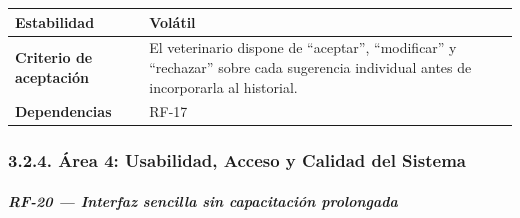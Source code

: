 \documentclass[
]{article}
\begin{document}
{\begin{longtable}[]{|
  >{\raggedright\arraybackslash}p{}|
  >{\raggedright\arraybackslash}p{}|}
\hline
\textbf{Estabilidad} & \begin{minipage}[t]{\linewidth}\raggedright
Volátil
\end{minipage} \\
\hline
\textbf{Criterio de aceptación} &
\begin{minipage}[t]{\linewidth}\raggedright
El veterinario dispone de “aceptar”, “modificar” y “rechazar” sobre cada sugerencia individual antes de incorporarla al historial.
\end{minipage} \\
\hline
\textbf{Dependencias} & \begin{minipage}[t]{\linewidth}\raggedright
RF-17
\end{minipage} \\
\hline
\end{longtable}
}

\subsubsection{3.2.4. Área 4: Usabilidad, Acceso y Calidad del Sistema}\label{area-4-usabilidad-acceso}

\subparagraph{RF-20 --- Interfaz sencilla sin capacitación prolongada}\label{rf-20-interfaz-sencilla-sin-capacitaci-n-prolo}
\end{document}
